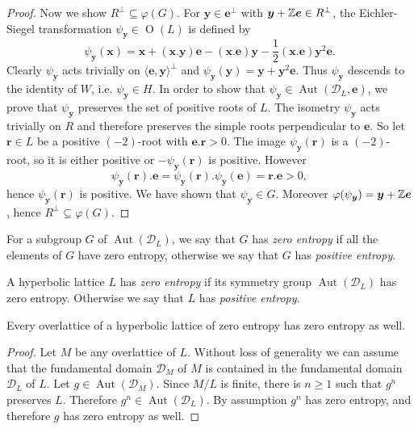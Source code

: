 \documentclass[11pt,letterpaper]{amsart}
\newcommand{\vect}[1]{\boldsymbol{#1}}
\DeclareMathOperator{\Aut}{Aut}
\DeclareMathOperator{\Or}{O}
\begin{document}
\begin{proof}
Now we show $R^\perp\subseteq \varphi(G)$.
 For $\vect{y} \in \vect{e}^\perp$ with $\vect{y}+\ZZ \vect{e} \in R^\perp$, the Eichler-Siegel transformation $\psi_{\vect{y}} \in \Or(L)$ is defined by
 \[\psi_{\vect{y}}(\vect{x})=\vect{x}+(\vect{x}.\vect{y})\vect{e} - (\vect{x}.\vect{e})\vect{y}-\frac{1}{2}(\vect{x}.\vect{e})\vect{y}^2 \vect{e}.\]
 Clearly $\psi_{\vect{y}}$ acts trivially on $\langle \vect{e},\vect{y}\rangle^\perp$ and $\psi_{\vect{y}}(\vect{y})=\vect{y}+\vect{y}^2\vect{e}$. Thus $\psi_{\vect{y}}$ descends to the identity of $W$, i.e. $\psi_{\vect{y}} \in H$. 
 In order to show that $\psi_{\vect{y}} \in \Aut(\mathcal{D}_L,\vect{e})$, we prove that $\psi_{\vect{y}}$ preserves the set of positive roots of $L$.
 The isometry $\psi_{\vect{y}}$ acts trivially on $R$ and therefore preserves the simple roots perpendicular to $\vect{e}$. So let $\vect{r}\in L$ be a positive $(-2)$-root with $\vect{e}.\vect{r}>0$. The image $\psi_{\vect{y}}(\vect{r})$ is a $(-2)$-root, so it is either positive or $-\psi_{\vect{y}}(\vect{r})$ is positive. However $$\psi_{\vect{y}}(\vect{r}).\vect{e} = \psi_{\vect{y}}(\vect{r}).\psi_{\vect{y}}(\vect{e}) = \vect{r}.\vect{e}>0,$$
hence $\psi_{\vect{y}}(\vect{r})$ is positive.
We have shown that $\psi_{\vect{y}} \in G$. Moreover $\varphi(\psi_{\vect{y}})=\vect{y}+\ZZ\vect{e}$, hence $R^\perp \subseteq \varphi(G)$.
\end{proof}

For a subgroup $G$ of $\Aut(\mathcal{D}_L)$, we say that $G$ has \emph{zero entropy} if all the elements of $G$ have zero entropy, otherwise we say that $G$ has \emph{positive entropy}.

\begin{definition}
A hyperbolic lattice $L$ has \emph{zero entropy} if its symmetry group $\Aut(\mathcal{D}_L)$ has zero entropy. Otherwise we say that $L$ has \emph{positive entropy}.
\end{definition}

\begin{proposition} \label{prop:entropy.overlattice}
Every overlattice of a hyperbolic lattice of zero entropy has zero entropy as well.
\end{proposition}
\begin{proof}
Let $M$ be any overlattice of $L$.
Without loss of generality we can assume that the fundamental domain $\mathcal{D}_M$ of $M$ is contained in the fundamental domain $\mathcal{D}_L$ of $L$. Let $g \in \Aut(\mathcal{D}_M)$. Since $M/L$ is finite, there is $n\ge 1$ such that $g^n$ preserves $L$. Therefore $g^n \in \Aut(\mathcal{D}_L)$. By assumption $g^n$ has zero entropy, and therefore $g$ has zero entropy as well.
\end{proof}
\end{document}
